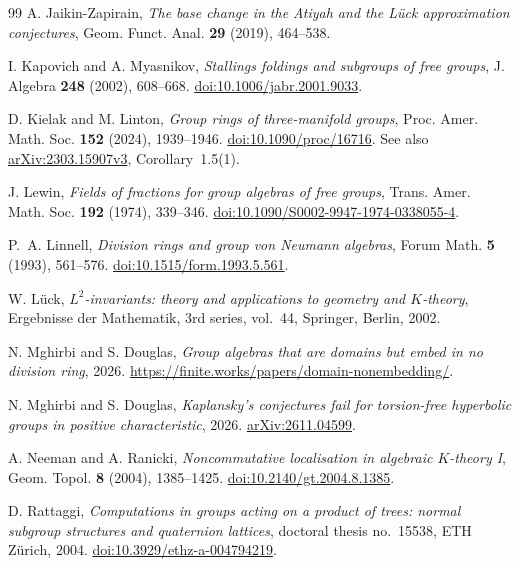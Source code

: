 \documentclass[11pt,a4paper,reqno]{amsart}
\numberwithin{equation}{section}
\theoremstyle{remark}
\begin{document}
\begin{thebibliography}{99}
 A. Jaikin-Zapirain,
\emph{The base change in the Atiyah and the L\"uck approximation conjectures},
Geom. Funct. Anal. \textbf{29} (2019), 464--538.

 I. Kapovich and A. Myasnikov,
\emph{Stallings foldings and subgroups of free groups},
J. Algebra \textbf{248} (2002), 608--668.
\href{https://doi.org/10.1006/jabr.2001.9033}{doi:10.1006/jabr.2001.9033}.

 D. Kielak and M. Linton, \emph{Group rings of three-manifold groups},
Proc. Amer. Math. Soc. \textbf{152} (2024), 1939--1946.
\href{https://doi.org/10.1090/proc/16716}{doi:10.1090/proc/16716}.
See also \href{https://arxiv.org/abs/2303.15907v3}{arXiv:2303.15907v3}, Corollary~1.5(1).

 J. Lewin, \emph{Fields of fractions for group
algebras of free groups}, Trans. Amer. Math. Soc. \textbf{192} (1974),
339--346. \href{https://doi.org/10.1090/S0002-9947-1974-0338055-4}{doi:10.1090/S0002-9947-1974-0338055-4}.

 P.~A. Linnell, \emph{Division rings and group von Neumann algebras},
Forum Math. \textbf{5} (1993), 561--576.
\href{https://doi.org/10.1515/form.1993.5.561}{doi:10.1515/form.1993.5.561}.

 W. L\"uck, \emph{\(L^2\)-invariants: theory and applications to geometry and \(K\)-theory},
Ergebnisse der Mathematik, 3rd series, vol.~44, Springer, Berlin, 2002.

 N. Mghirbi and S. Douglas, \emph{Group algebras that are domains but embed in no division ring}, 2026. \url{https://finite.works/papers/domain-nonembedding/}.

 N. Mghirbi and S. Douglas, \emph{Kaplansky's conjectures fail for torsion-free hyperbolic groups in positive characteristic}, 2026. \href{https://arxiv.org/abs/2611.04599}{arXiv:2611.04599}.

 A. Neeman and A. Ranicki,
\emph{Noncommutative localisation in algebraic \(K\)-theory I},
Geom. Topol. \textbf{8} (2004), 1385--1425.
\href{https://doi.org/10.2140/gt.2004.8.1385}{doi:10.2140/gt.2004.8.1385}.

 D. Rattaggi, \emph{Computations in groups acting on a product of trees: normal subgroup structures and quaternion lattices}, doctoral thesis no.~15538, ETH Z\"urich, 2004. \href{https://doi.org/10.3929/ethz-a-004794219}{doi:10.3929/ethz-a-004794219}.


\end{thebibliography}
\end{document}
